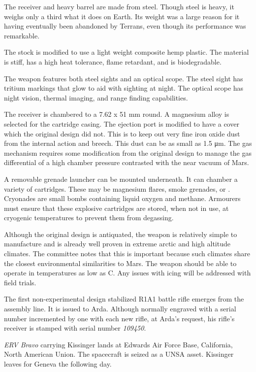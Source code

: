The receiver and heavy barrel are made from steel. Though steel is heavy, it weighs only a third what it does on Earth. Its weight was a large reason for it having eventually been abandoned by Terrans, even though its performance was remarkable.

The stock is modified to use a light weight composite hemp plastic. The material is stiff, has a high heat tolerance, flame retardant, and is biodegradable.

The weapon features both steel sights and an optical scope. The steel sight has tritium markings that glow to aid with sighting at night. The optical scope has night vision, thermal imaging, and range finding capabilities.

The receiver is chambered to a 7.62 x 51 mm round. A magnesium alloy is selected for the cartridge casing. The ejection port is modified to have a cover which the original design did not. This is to keep out very fine iron oxide dust from the internal action and breech. This dust can be as small as 1.5 μm. The gas mechanism requires some modification from the original design to manage the gas differential of a high chamber pressure contrasted with the near vacuum of Mars.

A removable grenade launcher can be mounted underneath. It can chamber a variety of cartridges. These may be magnesium flares, smoke grenades, or . Cryonades are small bombs containing liquid oxygen and methane. Armourers must ensure that these explosive cartridges are stored, when not in use, at cryogenic temperatures to prevent them from degassing.

Although the original design is antiquated, the weapon is relatively simple to manufacture and is already well proven in extreme arctic and high altitude climates. The committee notes that this is important because such climates share the closest environmental similarities to Mars. The weapon should be able to operate in temperatures as low as C. Any issues with icing will be addressed with field trials.
\StopTimelineDate

The first non-experimental design stabilized R1A1 battle rifle emerges from the assembly line. It is issued to Arda. Although normally engraved with a serial number incremented by one with each new rifle, at Arda's request, his rifle's receiver is stamped with serial number {\it 109450}.
\StopTimelineDate

{\it ERV Bravo} carrying Kissinger lands at Edwards Air Force Base, California, North American Union. The spacecraft is seized as a UNSA asset. Kissinger leaves for Geneva the following day.
\StopTimelineDate

